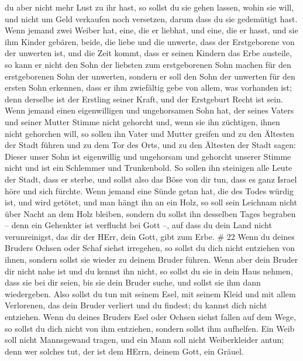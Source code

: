 du aber nicht mehr Lust zu ihr hast, so sollst du sie gehen lassen,
wohin sie will, und nicht um Geld verkaufen noch versetzen, darum dass
du sie gedemütigt hast.  Wenn jemand zwei Weiber hat, eine,
die er liebhat, und eine, die er hasst, und sie ihm Kinder gebären,
beide, die liebe und die unwerte, dass der Erstgeborene von der unwerten
ist,  und die Zeit kommt, dass er seinen Kindern das Erbe
austeile, so kann er nicht den Sohn der liebsten zum erstgeborenen Sohn
machen für den erstgeborenen Sohn der unwerten,  sondern er
soll den Sohn der unwerten für den ersten Sohn erkennen, dass er ihm
zwiefältig gebe von allem, was vorhanden ist; denn derselbe ist der
Erstling seiner Kraft, und der Erstgeburt Recht ist sein. 
Wenn jemand einen eigenwilligen und ungehorsamen Sohn hat, der seines
Vaters und seiner Mutter Stimme nicht gehorcht und, wenn sie ihn
züchtigen, ihnen nicht gehorchen will,  so sollen ihn Vater
und Mutter greifen und zu den Ältesten der Stadt führen und zu dem Tor
des Orts,  und zu den Ältesten der Stadt sagen: Dieser
unser Sohn ist eigenwillig und ungehorsam und gehorcht unserer Stimme
nicht und ist ein Schlemmer und Trunkenbold.  So sollen ihn
steinigen alle Leute der Stadt, dass er sterbe, und sollst also das Böse
von dir tun, dass es ganz Israel höre und sich fürchte. 
Wenn jemand eine Sünde getan hat, die des Todes würdig ist, und wird
getötet, und man hängt ihn an ein Holz,  so soll sein
Leichnam nicht über Nacht an dem Holz bleiben, sondern du sollst ihn
desselben Tages begraben -- denn ein Gehenkter ist verflucht bei Gott
--, auf dass du dein Land nicht verunreinigst, das dir der HErr, dein
Gott, gibt zum Erbe. \# 22  Wenn du deines Bruders Ochsen
oder Schaf siehst irregehen, so sollst du dich nicht entziehen von
ihnen, sondern sollst sie wieder zu deinem Bruder führen. 
Wenn aber dein Bruder dir nicht nahe ist und du kennst ihn nicht, so
sollst du sie in dein Haus nehmen, dass sie bei dir seien, bis sie dein
Bruder suche, und sollst sie ihm dann wiedergeben.  Also
sollst du tun mit seinem Esel, mit seinem Kleid und mit allem
Verlorenen, das dein Bruder verliert und du findest; du kannst dich
nicht entziehen.  Wenn du deines Bruders Esel oder Ochsen
siehst fallen auf dem Wege, so sollst du dich nicht von ihm entziehen,
sondern sollst ihm aufhelfen.  Ein Weib soll nicht
Mannsgewand tragen, und ein Mann soll nicht Weiberkleider antun; denn
wer solches tut, der ist dem HErrn, deinem Gott, ein Gräuel.
